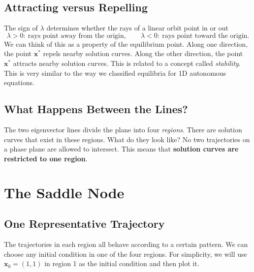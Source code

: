 \documentclass[11pt,letterpaper]{article}
\begin{document}
\subsection{Attracting versus Repelling}
The sign of $\lambda$ determines whether the rays of a linear orbit point in or out
\[
\boxed{
\lambda>0:\ \text{rays point away from the origin},\qquad
\lambda<0:\ \text{rays point toward the origin}.
}
\]
We can think of this as a property of the equilibrium point. Along one direction, the point $\textbf{x}^*$ repels nearby solution curves. Along the other direction, the point $\textbf{x}^*$ attracts nearby solution curves. This is related to a concept called \textit{stability}. This is very similar to the way we classified equilibria for 1D autonomous equations. 


\subsection{What Happens Between the Lines?}
The two eigenvector lines divide the plane into four \textit{regions}.
There are solution curves that exist in these regions. What do they look like?
No two trajectories on a phase plane are allowed to intersect. This means that
\textbf{solution curves are restricted to one region}.

\section{The Saddle Node}

\subsection{One Representative Trajectory}
The trajectories in each region all behave according to a certain pattern. We can choose any initial condition in one of the four regions. For simplicity, we will use $\textbf{x}_0=(1,1)$ in region 1 as the initial condition and then plot it.
\end{document}

